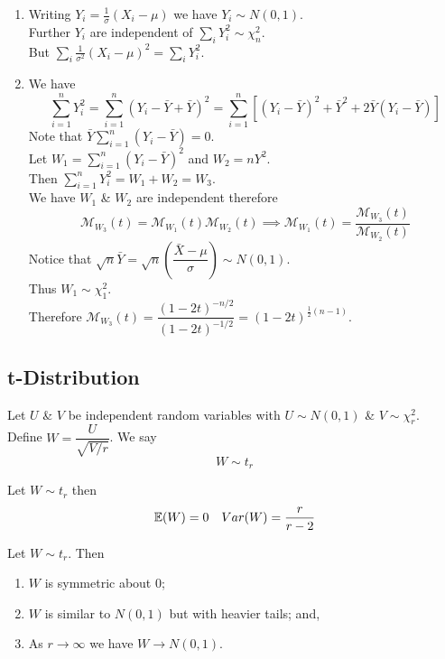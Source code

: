 \documentclass[11pt,a4paper]{article}
\begin{document}
\begin{enumerate}[label=\roman*)]
	\item Writing $Y_i=\frac{1}{\sigma}(X_i-\mu)$ we have $Y_i\sim N(0,1)$.\\
	Further $Y_i$ are independent of $\sum_iY_i^2\sim\chi_n^2$.\\
	But $\sum_i\frac{1}{\sigma^2}(X_i-\mu)^2=\sum_iY_i^2$.
	\item We have
	$$\sum_{i=1}^nY_i^2=\sum_{i=1}^n(Y_i-\bar{Y}+\bar{Y})^2=\sum_{i=1}^n\left[(Y_i-\bar{Y})^2+\bar{Y}^2+2\bar{Y}(Y_i-\bar{Y})\right]$$
	Note that $\bar{Y}\sum_{i=1}^n(Y_i-\bar{Y})=0$.\\
	Let $W_1=\sum_{i=1}^n(Y_i-\bar{Y})^2$ and $W_2=nY^2$.\\
	Then $\sum_{i=1}^nY_i^2=W_1+W_2=W_3$.\\
	We have $W_1$ \& $W_2$ are independent therefore
	$$\mathcal{M}_{W_3}(t)=\mathcal{M}_{W_1}(t)\mathcal{M}_{W_2}(t)\implies\mathcal{M}_{W_1}(t)=\frac{\mathcal{M}_{W_3}(t)}{\mathcal{M}_{W_2}(t)}$$
	Notice that $\sqrt{n}\bar{Y}=\sqrt{n}\left(\dfrac{\bar{X}-\mu}{\sigma}\right)\sim N(0,1)$.\\
	Thus $W_1\sim\chi^2_1$.\\
	Therefore $\mathcal{M}_{W_3}(t)=\dfrac{(1-2t)^{-n/2}}{(1-2t)^{-1/2}}=(1-2t)^{\frac{1}{2}(n-1)}$.
\end{enumerate}

\subsection{t-Distribution}

Let $U$ \& $V$ be independent random variables with $U\sim N(0,1)$ \& $V\sim\chi_r^2$.\\
Define $W=\dfrac{U}{\sqrt{V/r}}$. We say
$$W\sim t_r$$

Let $W\sim t_r$ then
$$\mathbb{E}(W)=0\quad Var(W)=\dfrac{r}{r-2}$$

Let $W\sim t_r$. Then
\begin{enumerate}[label=\roman*)]
	\item $W$ is symmetric about 0;
	\item $W$ is similar to $N(0,1)$ but with heavier tails; and,
	\item As $r\to\infty$ we have $W\to N(0,1)$.
\end{enumerate}
\end{document}
